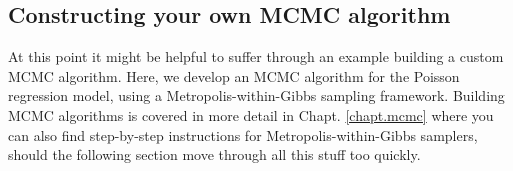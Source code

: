 
\subsection{ Constructing your own MCMC algorithm}
\label{GLMM.sect.mcmc}

At this point it might be helpful to suffer through an example
building a custom MCMC algorithm. Here, we develop an MCMC algorithm
for
the Poisson regression model, using a Metropolis-within-Gibbs sampling framework. 
Building MCMC algorithms is covered in more detail in Chapt. \ref{chapt.mcmc} where 
you can also find step-by-step instructions for Metropolis-within-Gibbs samplers, 
should the following section move through all this stuff too quickly.  


